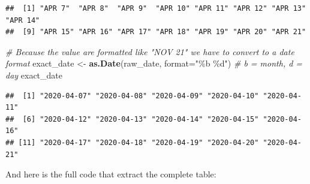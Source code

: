 \documentclass[
]{book}
\newenvironment{Shaded}{\begin{snugshade}}{\end{snugshade}}
\newcommand{\CommentTok}[1]{\textcolor[rgb]{0.56,0.35,0.01}{\textit{#1}}}
\newcommand{\DataTypeTok}[1]{\textcolor[rgb]{0.13,0.29,0.53}{#1}}
\newcommand{\KeywordTok}[1]{\textcolor[rgb]{0.13,0.29,0.53}{\textbf{#1}}}
\newcommand{\NormalTok}[1]{#1}
\newcommand{\StringTok}[1]{\textcolor[rgb]{0.31,0.60,0.02}{#1}}
\begin{document}
\begin{verbatim}
##  [1] "APR 7"  "APR 8"  "APR 9"  "APR 10" "APR 11" "APR 12" "APR 13" "APR 14"
##  [9] "APR 15" "APR 16" "APR 17" "APR 18" "APR 19" "APR 20" "APR 21"
\end{verbatim}

\begin{Shaded}
\begin{Highlighting}[]
\CommentTok{\# Because the value are formatted like "NOV 21" we have to convert to a date format}
\NormalTok{exact\_date \textless{}{-}}\StringTok{ }\KeywordTok{as.Date}\NormalTok{(raw\_date, }\DataTypeTok{format=}\StringTok{"\%b \%d"}\NormalTok{) }\CommentTok{\# b = month, d = day}
\NormalTok{exact\_date}
\end{Highlighting}
\end{Shaded}

\begin{verbatim}
##  [1] "2020-04-07" "2020-04-08" "2020-04-09" "2020-04-10" "2020-04-11"
##  [6] "2020-04-12" "2020-04-13" "2020-04-14" "2020-04-15" "2020-04-16"
## [11] "2020-04-17" "2020-04-18" "2020-04-19" "2020-04-20" "2020-04-21"
\end{verbatim}

And here is the full code that extract the complete table:
\end{document}
